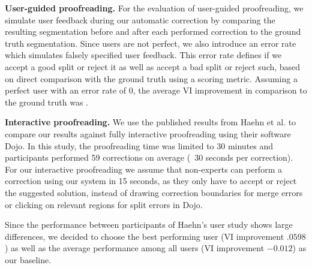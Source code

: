\textbf{User-guided proofreading.} For the evaluation of user-guided proofreading, we simulate user feedback during our automatic correction by comparing the resulting segmentation before and after each performed correction to the ground truth segmentation. Since users are not perfect, we also introduce an error rate which simulates falsely specified user feedback. This error rate defines if we accept a good split or reject it as well as accept a bad split or reject such, based on direct comparison with the ground truth using a scoring metric. Assuming a perfect user with an error rate of 0, the average VI improvement in comparison to the ground truth was .

\textbf{Interactive proofreading.} We use the published results from Haehn et al. to compare our results against fully interactive proofreading using their software Dojo. In this study, the proofreading time was limited to 30 minutes and participants performed 59 corrections on average (~30 seconds per correction). For our interactive proofreading we assume that  non-experts can perform a correction using our system in 15 seconds, as they only have to accept or reject the suggested solution, instead of drawing correction boundaries for merge errors or clicking on relevant regions for split errors in Dojo. 

Since the performance between participants of Haehn's user study shows large differences, we decided to choose the best performing user (VI improvement $.0598$) as well as the average performance among all users (VI improvement $-0.012$) as our baseline.

